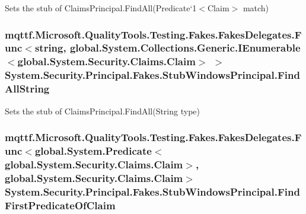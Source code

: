 Sets the stub of Claims\-Principal.\-Find\-All(Predicate`1$<$Claim$>$ match)

\hypertarget{class_system_1_1_security_1_1_principal_1_1_fakes_1_1_stub_windows_principal_a309fbc5a068eb2b2c1e5427b36faf89c}{
\subsubsection[{Find\-All\-String}]{\setlength{\rightskip}{0pt plus 5cm}mqttf.\-Microsoft.\-Quality\-Tools.\-Testing.\-Fakes.\-Fakes\-Delegates.\-Func$<$string, global.\-System.\-Collections.\-Generic.\-I\-Enumerable$<$global.\-System.\-Security.\-Claims.\-Claim$>$ $>$ System.\-Security.\-Principal.\-Fakes.\-Stub\-Windows\-Principal.\-Find\-All\-String}}\label{class_system_1_1_security_1_1_principal_1_1_fakes_1_1_stub_windows_principal_a309fbc5a068eb2b2c1e5427b36faf89c}


Sets the stub of Claims\-Principal.\-Find\-All(\-String type)

\hypertarget{class_system_1_1_security_1_1_principal_1_1_fakes_1_1_stub_windows_principal_a6a34ac4f818fbdf28b8e5f0244208507}{
\subsubsection[{Find\-First\-Predicate\-Of\-Claim}]{\setlength{\rightskip}{0pt plus 5cm}mqttf.\-Microsoft.\-Quality\-Tools.\-Testing.\-Fakes.\-Fakes\-Delegates.\-Func$<$global.\-System.\-Predicate$<$global.\-System.\-Security.\-Claims.\-Claim$>$, global.\-System.\-Security.\-Claims.\-Claim$>$ System.\-Security.\-Principal.\-Fakes.\-Stub\-Windows\-Principal.\-Find\-First\-Predicate\-Of\-Claim}}\label{class_system_1_1_security_1_1_principal_1_1_fakes_1_1_stub_windows_principal_a6a34ac4f818fbdf28b8e5f0244208507}


